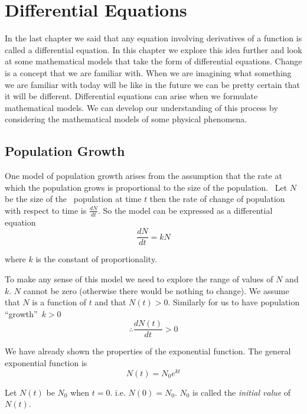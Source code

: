 \chapter{Differential Equations}

In the last chapter we said that any equation involving derivatives of a function is called a differential equation.  In
this chapter we explore this idea further and look at some mathematical models that take the form of differential equations.  Change
is a concept that we are familiar with.  When we are imagining what something we are familiar with today will
be like in the future we can be pretty certain that it will be different.  Differential equations can arise when
we formulate mathematical models.  We can develop our understanding of this process by considering the mathematical
models of some physical phenomena. 

\section{Population Growth}
One model of population growth arises from the assumption that the rate at which the population grows is proportional to the size of the population.
\ Let $N$ be the size of the  \ population at time
$t$ then the rate of change of population with respect to time is $\frac{d N}{d t}\text{.}$  So the model can be expressed as a differential equation
\begin{equation*}\frac{d N}{d t} =k N
\end{equation*}

where $k$ is the constant of proportionality. 

To make any sense of this model we need to explore the range of values
of $N$ and $k$.  $N$ cannot be zero (otherwise there would be nothing to change).  We assume that $N$ is a function of $t$ and that $N (t) >0$.  Similarly for us to have population ``growth''\  $k >0$
\begin{equation*} \therefore \frac{d N (t)}{d t} >0
\end{equation*}

We have already shown the properties of the exponential function.  The
general exponential function is
\begin{equation*}N (t) =N_{0} e^{k t}
\end{equation*}

Let $N (t)$ be $N_{0}$ when $t =0$.  i.e. $N (0) =N_{0}\text{.}$  $N_{0}$ is called the \emph{initial value} of $N (t)$. 

